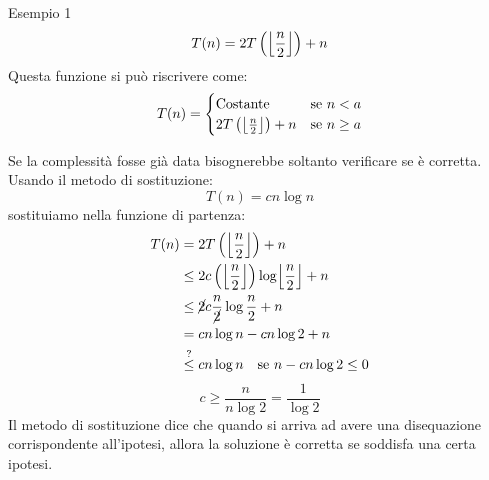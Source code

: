 \documentclass[a4paper]{article}
\DeclarePairedDelimiter\floor{\lfloor}{\rfloor}
\begin{document}
\begin{examplebox}{Esempio 1}
  \[
    T(n) = 2T\left(\floor*{\frac{n}{2}}\right) + n
  \] 
  Questa funzione si può riscrivere come:
  \[
  T(n) = \begin{cases}
    \text{Costante} & \text{se } n < a \\
    2T\left(\floor*{\frac{n}{2}}\right) + n & \text{se } n \ge a
  \end{cases}
  \] 

  \vspace{1em}
  \noindent
  Se la complessità fosse già data bisognerebbe soltanto verificare se è corretta.
  Usando il metodo di sostituzione:
  \[
    T(n) = cn \log n
  \] 
  sostituiamo nella funzione di partenza:
  \[
    \begin{aligned}
      T(n)  & = 2T\left(\floor*{\frac{n}{2}}\right) + n\\
            & \le 2c\left(\floor*{\frac{n}{2}}\right) \log \floor*{\frac{n}{2}} + n\\
            & \le \cancel{2} c \frac{n}{\cancel{2}} \log \frac{n}{2} + n\\
            & = cn \log n - cn \log 2 + n\\
            & \stackrel{?}{\le} cn \log n \quad \text{se } n- cn \log 2 \le 0\\
    \end{aligned}
  \] 
  \[
    c \ge \frac{n}{n \log 2} = \frac{1}{\log 2}
  \] 
  Il metodo di sostituzione dice che quando si arriva ad avere una disequazione
  corrispondente all'ipotesi, allora la soluzione è corretta se soddisfa una certa ipotesi.
\end{examplebox}
\end{document}
